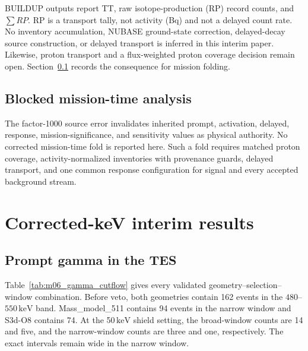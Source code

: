 \documentclass[11pt]{article}
\newcommand{\keV}{\ensuremath{\,\mathrm{keV}}}
\begin{document}
BUILDUP outputs report TT, raw isotope-production (RP) record counts, and
$\sum RP$. RP is a transport tally, not activity (Bq) and not a delayed count
rate. No inventory accumulation, NUBASE ground-state correction, delayed-decay
source construction, or delayed transport is inferred in this interim paper.
Likewise, proton transport and a flux-weighted proton coverage decision remain
open. Section~\ref{sec:mission_time_fold} records the consequence for mission
folding.

\subsection{Blocked mission-time analysis}
\label{sec:mission_time_fold}

The factor-1000 source error invalidates inherited prompt, activation, delayed,
response, mission-significance, and sensitivity values as physical authority.
No corrected mission-time fold is reported here. Such a fold requires matched
proton coverage, activity-normalized inventories with provenance guards,
delayed transport, and one common response configuration for signal and every
accepted background stream.

\section{Corrected-keV interim results}
\label{sec:results}

\subsection{Prompt gamma in the TES}

Table~\ref{tab:m06_gamma_cutflow} gives every validated
geometry--selection--window combination. Before veto, both geometries contain
162 events in the $480$--$550\keV$ band. Mass\_model\_511 contains 94 events in
the narrow window and S3d-O8 contains 74. At the 50\keV{} shield setting, the
broad-window counts are 14 and five, and the narrow-window counts are three and
one, respectively. The exact intervals remain wide in the narrow window.
\end{document}
